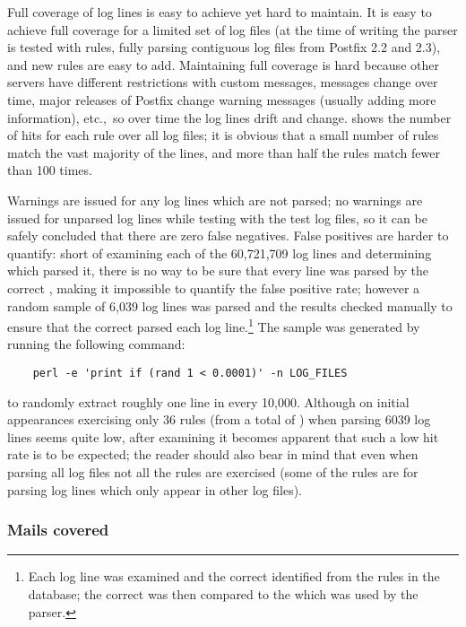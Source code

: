 Full coverage of log lines is easy to achieve yet hard to maintain.  It is
easy to achieve full coverage for a limited set of log files (at the time
of writing the parser is tested with \numberOFrules{} rules, fully parsing
\numberOFlogFILES{} contiguous log files from Postfix 2.2 and 2.3), and new
rules are easy to add.  Maintaining full coverage is hard because other
servers have different restrictions with custom messages, \DNSBL{} messages
change over time, major releases of Postfix change warning messages
(usually adding more information), etc.,\ so over time the log lines drift
and change.   shows the number of hits
for each rule over all \numberOFlogFILES{} log files; it is obvious that a
small number of rules match the vast majority of the lines, and more than
half the rules match fewer than 100 times.

Warnings are issued for any log lines which are not parsed; no warnings are
issued for unparsed log lines while testing with the \numberOFlogFILES{}
test log files, so it can be safely concluded that there are zero false
negatives.  False positives are harder to quantify: short of examining each
of the 60,721,709 log lines and determining which \regex{} parsed it, there
is no way to be sure that every line was parsed by the correct \regex{},
making it impossible to quantify the false positive rate; however a random
sample of 6,039 log lines was parsed and the results checked manually to
ensure that the correct \regex{} parsed each log line.\footnote{Each log
line was examined and the correct \regex{} identified from the
\numberOFrules{} rules in the database; the correct \regex{} was then
compared to the \regex{} which was used by the parser.}  The sample was
generated by running the following command:

\verb!    perl -e 'print if (rand 1 < 0.0001)' -n LOG_FILES!

\noindent{}to randomly extract roughly one line in every 10,000.  Although
on initial appearances exercising only 36 rules (from a total of
\numberOFrules{}) when parsing 6039 log lines seems quite low, after
examining  it becomes apparent that such
a low hit rate is to be expected; the reader should also bear in mind that
even when parsing all \numberOFlogFILES{} log files not all the rules are
exercised (some of the rules are for parsing log lines which only appear in
other log files).

\subsubsection{Mails covered}

